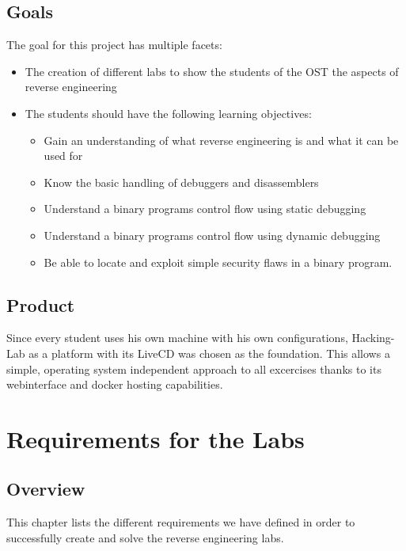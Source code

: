 \subsection{Goals}
The goal for this project has multiple facets:
\begin{itemize}
    \item The creation of different labs to show the students of the OST the aspects of reverse engineering
    \item The students should have the following learning objectives:
    \begin{itemize}
        \item Gain an understanding of what reverse engineering is and what it can be used for
        \item Know the basic handling of debuggers and disassemblers
        \item Understand a binary programs control flow using static debugging
        \item Understand a binary programs control flow using dynamic debugging
        \item Be able to locate and exploit simple security flaws in a binary program.
    \end{itemize}
\end{itemize}

\subsection{Product}
Since every student uses his own machine with his own configurations, Hacking-Lab as a platform with its LiveCD was chosen as the foundation. This allows a simple, operating system independent approach to all excercises thanks to its webinterface and docker hosting capabilities. 

\section{Requirements for the Labs}

\subsection{Overview}
This chapter lists the different requirements we have defined in order to successfully create and solve the reverse engineering labs.
